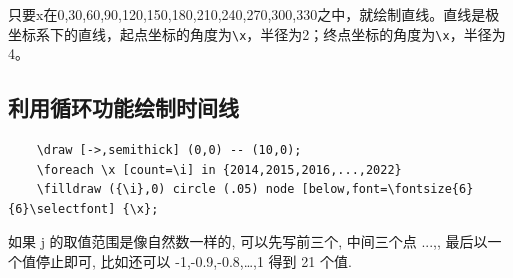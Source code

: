 \begin{center}
\end{center}

只要x在{0,30,60,90,120,150,180,210,240,270,300,330}之中，就绘制直线。直线是极坐标系下的直线，起点坐标的角度为\verb|\x|，半径为2；终点坐标的角度为\verb|\x|，半径为4。

\subsection{利用循环功能绘制时间线}

\begin{lstlisting}
    \draw [->,semithick] (0,0) -- (10,0);
    \foreach \x [count=\i] in {2014,2015,2016,...,2022}
    \filldraw ({\i},0) circle (.05) node [below,font=\fontsize{6}{6}\selectfont] {\x};
\end{lstlisting}

\begin{remark}
    如果 j 的取值范围是像自然数一样的, 可以先写前三个, 中间三个点 ...,, 最后以一个值停止即可, 比如还可以 -1,-0.9,-0.8,…,1 得到 21 个值. 
\end{remark}

\begin{center}
    \begin{center}
    \end{center}
\end{center}

